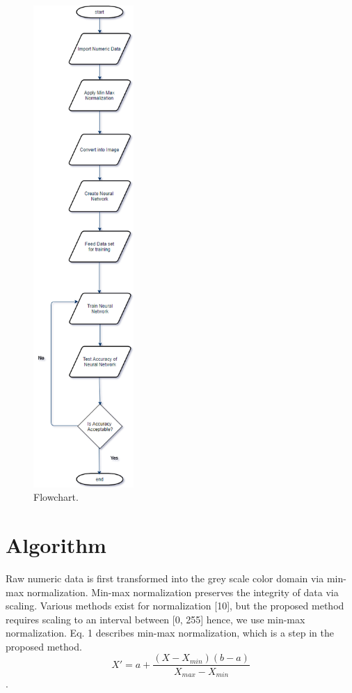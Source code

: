 \begin{figure}[h!]
	\centering	
	\includegraphics[width=1.5in]{Flowchart.png} %
	\caption{ Flowchart.}
	\label{fig:9} %
	
\end{figure}
\section{Algorithm}
Raw numeric data is first transformed into the grey
scale color domain via min-max normalization. Min-max
normalization preserves the integrity of data via scaling.
Various methods exist for normalization [10], but the proposed
method requires scaling to an interval between [0, 255] hence,
we use min-max normalization. Eq. 1 describes min-max
normalization, which is a step in the proposed method.
\begin{equation} X'=a+ \frac{(X- X_{min})(b-a)}{X_{max} - X_{min}} \end{equation}.
	

